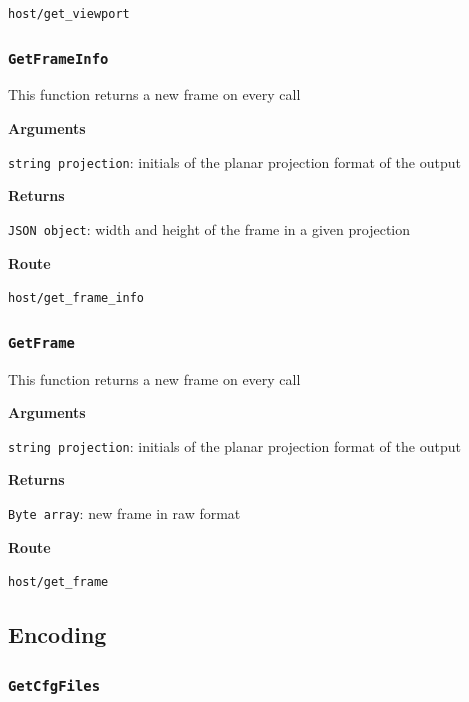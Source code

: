 \documentclass{article}
\begin{document}
\texttt{host/get_viewport}


\subsubsection*{\texttt{GetFrameInfo}}

This function returns a new frame on every call

\textbf{Arguments}

\texttt{string projection}: initials of the planar projection format of the output

\textbf{Returns}

\texttt{JSON object}: width and height of the frame in a given projection

\textbf{Route}

\texttt{host/get_frame_info}


\subsubsection*{\texttt{GetFrame}}

This function returns a new frame on every call

\textbf{Arguments}

\texttt{string projection}: initials of the planar projection format of the output

\textbf{Returns}

\texttt{Byte array}: new frame in raw format

\textbf{Route}

\texttt{host/get_frame}


\subsection{Encoding}

\subsubsection*{\texttt{GetCfgFiles}}
\end{document}
